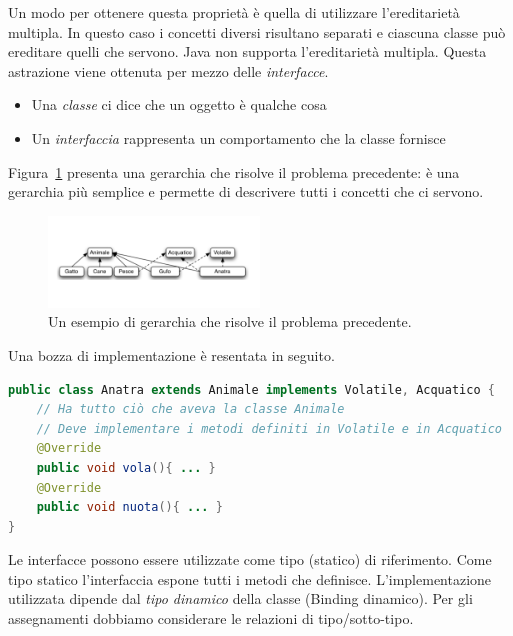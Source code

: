 \documentclass{article}
\begin{document}
Un modo per ottenere questa propriet\`a \`e quella di utilizzare l'ereditariet\`a multipla. In questo caso i concetti diversi risultano separati e ciascuna classe pu\`o ereditare quelli che servono. Java non supporta l'ereditariet\`a multipla. Questa astrazione viene ottenuta per mezzo delle \emph{interfacce}.

\begin{itemize}
\item Una \emph{classe} ci dice che un oggetto \`e qualche cosa
\item Un \emph{interfaccia} rappresenta un comportamento che la classe fornisce
\end{itemize}

Figura~\ref{Fig:gerarchy4} presenta una gerarchia che risolve il problema precedente: \`e una gerarchia pi\`u semplice e permette di descrivere tutti i concetti che ci servono.
\begin{figure}[h!]
  \centering
    \includegraphics[width=0.5\textwidth]{gerarchia4.pdf}
      \caption{Un esempio di gerarchia che risolve il problema precedente.}
      \label{Fig:gerarchy4}
\end{figure}

Una bozza di implementazione \`e resentata in seguito.
\begin{lstlisting}[language=Java,escapechar=|]
public class Anatra extends Animale implements Volatile, Acquatico { 
    // Ha tutto ciò che aveva la classe Animale
    // Deve implementare i metodi definiti in Volatile e in Acquatico 
    @Override
    public void vola(){ ... }
    @Override
    public void nuota(){ ... } 
}
\end{lstlisting}
Le interfacce possono essere utilizzate come tipo (statico) di riferimento. Come tipo statico l'interfaccia espone tutti i metodi che definisce.
L'implementazione utilizzata dipende dal \emph{tipo dinamico} della classe (Binding dinamico). Per gli assegnamenti dobbiamo considerare le relazioni di tipo/sotto-tipo.
\end{document}
